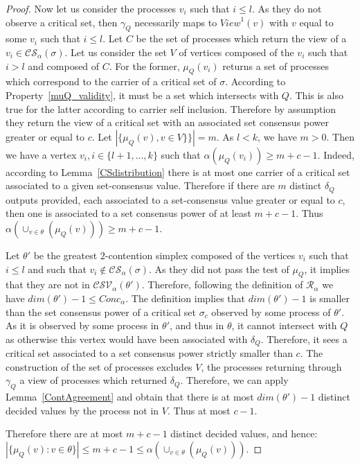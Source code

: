 \documentclass[a4paper]{article}
\def\R{\ensuremath{\mathcal{R}}}
\begin{document}
\begin{proof}
Now let us consider the processes $v_i$ such that $i\leq l$. As they do not observe a critical set, then
$\gamma_Q$ necessarily maps to $\mathit{View}^1(v)$ with $v$ equal to some $v_i$ such that $i\leq l$.
Let $C$ be the set of processes which return the view of a $v_i\in \mathcal{CS}_\alpha(\sigma)$.
Let us consider the set $V$ of vertices composed of the $v_i$ such that $i> l$ and composed of $C$. For the former, $\mu_Q(v_i)$ returns a set of processes which correspond to the carrier of a critical set of $\sigma$. According to Property~\ref{muQ_validity}, it must be a set which intersects with $Q$. This is also true for the latter according to carrier self inclusion. Therefore by assumption they return the view of a critical set with an associated set consensus power greater or equal to $c$. 
Let $|\{\mu_Q(v),v\in V\}\}|=m$. As $l<k$, we have $m>0$. Then we have a vertex $v_i, i\in\{l+1,\dots,k\}$ such that $\alpha(\mu_Q(v_i))\geq m+c-1$. Indeed, according to Lemma~\ref{CSdistribution} there is at most one carrier of a critical set associated to a given set-consensus value. Therefore if there are $m$ distinct $\delta_Q$ outputs provided, each associated to a set-consensus value greater or equal to $c$, then one is associated to a set consensus power of at least $m+c-1$. Thus $\alpha(\cup_{v\in\theta}(\mu_Q(v)))\geq m+c-1$.

Let $\theta'$ be the greatest $2$-contention simplex composed of the vertices $v_i$ such that $i\leq l$
and such that $v_i\not\in\mathcal{CS}_\alpha(\sigma)$. As they did not pass the test of $\mu_Q$, it implies that they are not in $\mathcal{CSV}_\alpha(\theta')$. Therefore, following the definition of $\R_\alpha$ we have $\mathit{dim}(\theta')-1\leq \mathit{Conc}_\alpha$. The definition implies that  $\mathit{dim}(\theta')-1$ is smaller than the set consensus power of a critical set $\sigma_c$ observed by some process of $\theta'$. As it is observed by some process in $\theta'$, and thus in $\theta$, it cannot intersect with $Q$ as otherwise this vertex would have been associated with $\delta_Q$.
Therefore, it sees a critical set associated to a set consensus power strictly smaller than $c$. 
The construction of the set of processes excludes $V$, the processes returning through $\gamma_Q$ a view of processes which returned $\delta_Q$. Therefore, we can apply Lemma~\ref{ContAgreement} and obtain that there is at most $\mathit{dim}(\theta')-1$
distinct decided values by the process not in $V$. Thus at most $c-1$.

Therefore there are at most $m+c-1$ distinct decided values, and hence:
$|\{\mu_Q(v):v\in\theta\}|\leq m+c-1 \leq \alpha(\cup_{v\in\theta}(\mu_Q(v)))$.
\end{proof}
\end{document}
